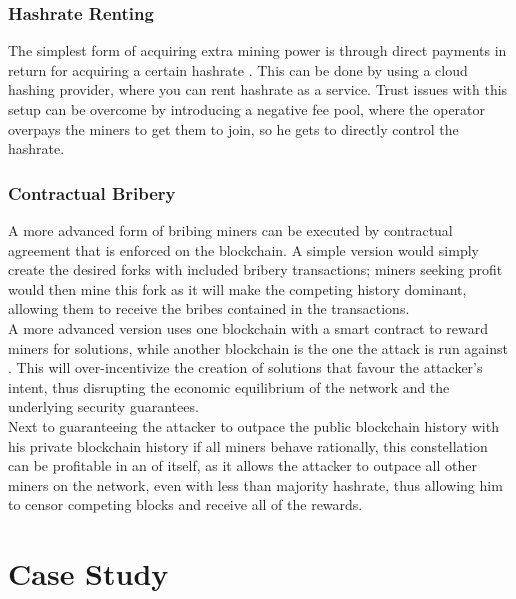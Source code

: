 \documentclass[12pt,a4paper]{article}
\begin{document}
\subsubsection{Hashrate Renting}

The simplest form of acquiring extra mining power is through direct payments in return for acquiring a certain \gls{hashrate} \cite{bribery}. This can be done by using a cloud hashing provider, where you can rent \gls{hashrate} as a service. Trust issues with this setup can be overcome by introducing a negative fee \gls{pool}, where the operator overpays the miners to get them to join, so he gets to directly control the \gls{hashrate}.\\

\subsubsection{Contractual Bribery}

A more advanced form of bribing miners can be executed by contractual agreement that is enforced on the blockchain. A simple version would simply create the desired forks with included bribery \glspl{transaction}; miners seeking profit would then mine this fork as it will make the competing history dominant, allowing them to receive the bribes contained in the \glspl{transaction}.\\

A more advanced version uses one \gls{blockchain} with a smart contract to reward miners for solutions, while another \gls{blockchain} is the one the attack is run against \cite{puzzles}. This will over-incentivize the creation of solutions that favour the attacker's intent, thus disrupting the economic equilibrium of the network and the underlying security guarantees.\\

Next to guaranteeing the attacker to outpace the public blockchain history with his private blockchain history if all miners behave rationally, this constellation can be profitable in an of itself, as it allows the attacker to outpace all other miners on the network, even with less than majority \gls{hashrate}, thus allowing him to censor competing blocks and receive all of the rewards.\\

\section{Case Study}
\end{document}
